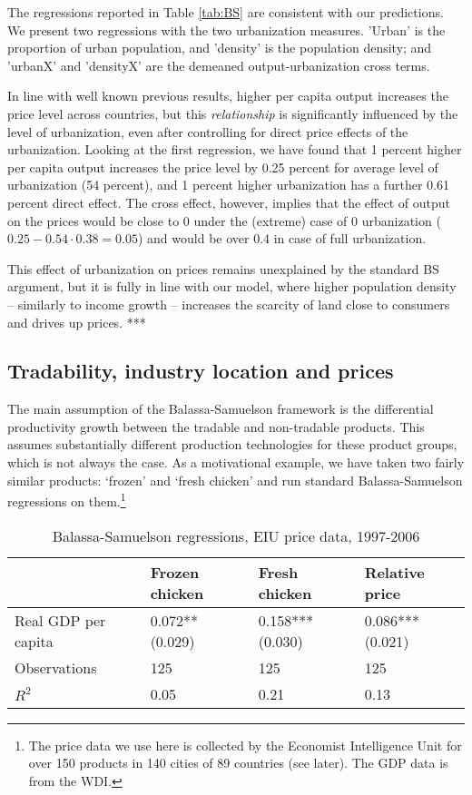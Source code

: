 \documentclass[12pt]{article}
\begin{document}
The regressions reported in Table \ref{tab:BS} are consistent with our predictions. We present two regressions with the two urbanization measures. 'Urban' is the proportion of urban population, and 'density' is the population density; and 'urbanX' and 'densityX' are the demeaned
output-urbanization cross terms.

In line with well known previous results, higher per capita output
increases the price level across countries, but this \emph{relationship} is significantly influenced by the level of urbanization, even after controlling for direct price effects of the urbanization. Looking at the first regression, we have found that 1 percent higher per capita output increases the price level by 0.25 percent for average level of urbanization (54 percent), and 1 percent higher urbanization has a further 0.61 percent direct effect. The cross effect, however, implies that the effect of output on the prices would be close to 0 under the (extreme) case of 0 urbanization ($0.25-0.54\cdot0.38=0.05$) and would be over 0.4 in case of full urbanization.

This effect of urbanization on prices remains unexplained by the standard BS argument, but it is fully in line with our model, where higher population density -- similarly to income growth -- increases the scarcity of land close to consumers and drives up prices. ***

\subsection{Tradability, industry location and prices}

The main assumption of the Balassa-Samuelson framework is the differential productivity growth between the tradable and non-tradable products. This assumes substantially different production technologies for these product groups, which is not always the case. As a motivational example, we have taken two fairly similar products: `frozen' and `fresh chicken' and run standard Balassa-Samuelson regressions on them.\footnote{The price data we use here is collected by the Economist Intelligence Unit for over 150 products in 140 cities of 89 countries (see later). The GDP data is from the WDI.}

\begin{table}[h!]
\center
\caption{Balassa-Samuelson regressions, EIU price data, 1997-2006}
\begin{tabular}{lm{5em}m{5em}m{5em}}
  \hline\hline
   & Frozen chicken & Fresh chicken & Relative price\\
   \hline
  Real GDP per capita & 0.072**   (0.029) & 0.158***   (0.030) & 0.086***   (0.021)\\
\hline
  Observations &  125 & 125 & 125
\\
  $R^2$ &  0.05& 0.21 & 0.13
\\
  \hline\hline
\end{tabular}
\end{table}
\end{document}
